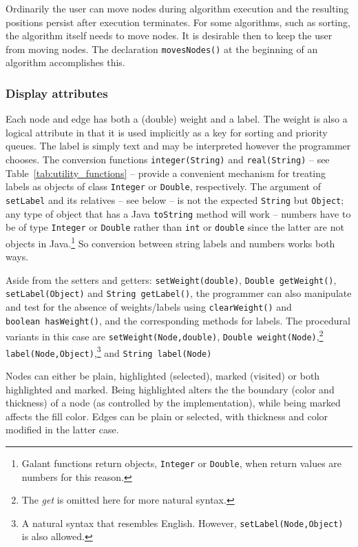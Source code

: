 Ordinarily the user can move nodes during algorithm execution
and the resulting positions persist after execution terminates.
For some algorithms, such as sorting, the algorithm itself needs to move
nodes.
It is desirable then to keep the user from moving nodes.
The declaration \texttt{movesNodes()} at the beginning of an algorithm
accomplishes this.

\subsubsection{Display attributes} \label{sec:display_attributes}

Each node and edge has
both a (double) weight and a label.
The weight
is also a logical
attribute in that
it is used implicitly as a
key for
sorting and priority queues.
The label is simply text and may be interpreted however the programmer
chooses.
The conversion functions \texttt{integer(String)}
and \texttt{real(String)}
-- see Table~\ref{tab:utility_functions}
-- provide a convenient mechanism for treating labels as objects of class
\texttt{Integer} or \texttt{Double}, respectively.
The argument of \texttt{setLabel} and its relatives -- see below
-- is not the expected \texttt{String}
but \texttt{Object};
any type of object that has a Java \texttt{toString} method will work
-- numbers have to be of type \texttt{Integer} or \texttt{Double}
rather than \texttt{int} or \texttt{double} since the latter are not objects
in Java.\footnote{
  Galant functions return objects, \texttt{Integer} or \texttt{Double}, when
  return values are numbers for this reason.
}
So conversion between string labels and numbers works both ways.

Aside from the setters and getters: \texttt{setWeight(double)},
\mbox{\texttt{Double getWeight()}}, \texttt{setLabel(Object)}
and \mbox{\texttt{String getLabel()}}, the programmer can also
manipulate and test for the absence of weights/labels using
\texttt{clearWeight()} and \texttt{boolean~hasWeight()},
and the corresponding methods for labels.
The procedural variants in this case are
\texttt{setWeight(Node,double)},
\mbox{\texttt{Double weight(Node)}},\footnote{
  The \emph{get} is omitted here for more natural syntax.}
\texttt{label(Node,Object)},\footnote{
  A natural syntax that resembles English. However,
  \texttt{setLabel(Node,Object)} is also allowed.
}
and \mbox{\texttt{String label(Node)}}

Nodes can either be plain, highlighted (selected), marked (visited) or both highlighted and
marked.
Being highlighted alters the
the boundary (color and thickness) of a node (as controlled by the
implementation), while being marked affects the fill color.
Edges can be plain or selected, with thickness and color modified in the
latter case.

